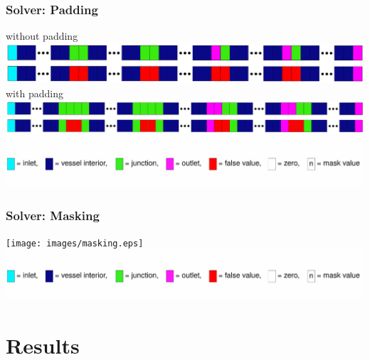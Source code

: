 \documentclass[compress]{beamer}
\begin{document}
\begin{frame}
	\frametitle{Solver: Padding}
	without padding
	\includegraphics[width=\textwidth]{images/padding1.eps}
	with padding
	\includegraphics[width=\textwidth]{images/padding2.eps}
	\includegraphics[width=\textwidth]{images/legend.eps}
\end{frame}
\begin{frame}
	\frametitle{Solver: Masking}
	\texttt{[image: images/masking.eps]}
	\includegraphics[width=\textwidth]{images/legend.eps}
\end{frame}

\section{Results}
\end{document}
